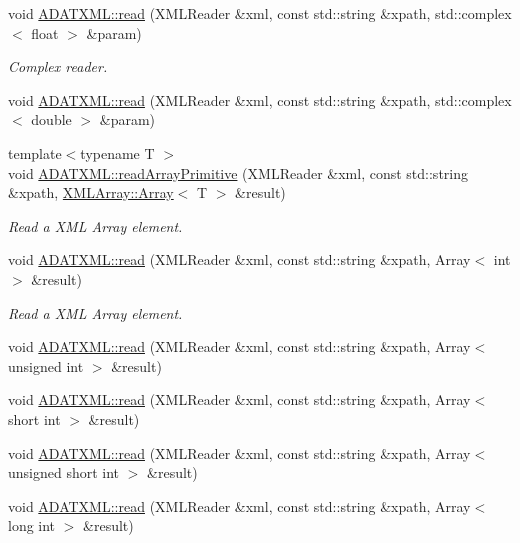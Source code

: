 \begin{DoxyCompactItemize}
\item 
void \mbox{\hyperlink{group__io_ga1287217ff7c9cbae6a6c958ee2de7776}{A\+D\+A\+T\+X\+M\+L\+::read}} (X\+M\+L\+Reader \&xml, const std\+::string \&xpath, std\+::complex$<$ float $>$ \&param)
\begin{DoxyCompactList}\small\item\em Complex reader. \end{DoxyCompactList}\item 
void \mbox{\hyperlink{group__io_gaf79f2861a8d55a3e88311959e646b0e1}{A\+D\+A\+T\+X\+M\+L\+::read}} (X\+M\+L\+Reader \&xml, const std\+::string \&xpath, std\+::complex$<$ double $>$ \&param)
\item 
{\footnotesize template$<$typename T $>$ }\\void \mbox{\hyperlink{namespaceADATXML_aaefbc18d9018a09271e0b949526730ab}{A\+D\+A\+T\+X\+M\+L\+::read\+Array\+Primitive}} (X\+M\+L\+Reader \&xml, const std\+::string \&xpath, \mbox{\hyperlink{classXMLArray_1_1Array}{X\+M\+L\+Array\+::\+Array}}$<$ T $>$ \&result)
\begin{DoxyCompactList}\small\item\em Read a X\+ML Array element. \end{DoxyCompactList}\item 
void \mbox{\hyperlink{group__io_gaeaed8077b8bee4f4277ea0cc8cc13744}{A\+D\+A\+T\+X\+M\+L\+::read}} (X\+M\+L\+Reader \&xml, const std\+::string \&xpath, Array$<$ int $>$ \&result)
\begin{DoxyCompactList}\small\item\em Read a X\+ML Array element. \end{DoxyCompactList}\item 
void \mbox{\hyperlink{group__io_ga2eaf76c05e59884bd34813884eef708b}{A\+D\+A\+T\+X\+M\+L\+::read}} (X\+M\+L\+Reader \&xml, const std\+::string \&xpath, Array$<$ unsigned int $>$ \&result)
\item 
void \mbox{\hyperlink{group__io_gaa9246e7914f16a84371b00a4910a535a}{A\+D\+A\+T\+X\+M\+L\+::read}} (X\+M\+L\+Reader \&xml, const std\+::string \&xpath, Array$<$ short int $>$ \&result)
\item 
void \mbox{\hyperlink{group__io_ga778f9eca273d2180afff1ba58606a153}{A\+D\+A\+T\+X\+M\+L\+::read}} (X\+M\+L\+Reader \&xml, const std\+::string \&xpath, Array$<$ unsigned short int $>$ \&result)
\item 
void \mbox{\hyperlink{group__io_ga28f3bc5eedbefea7d81064c339e72f97}{A\+D\+A\+T\+X\+M\+L\+::read}} (X\+M\+L\+Reader \&xml, const std\+::string \&xpath, Array$<$ long int $>$ \&result)

\end{DoxyCompactItemize}
